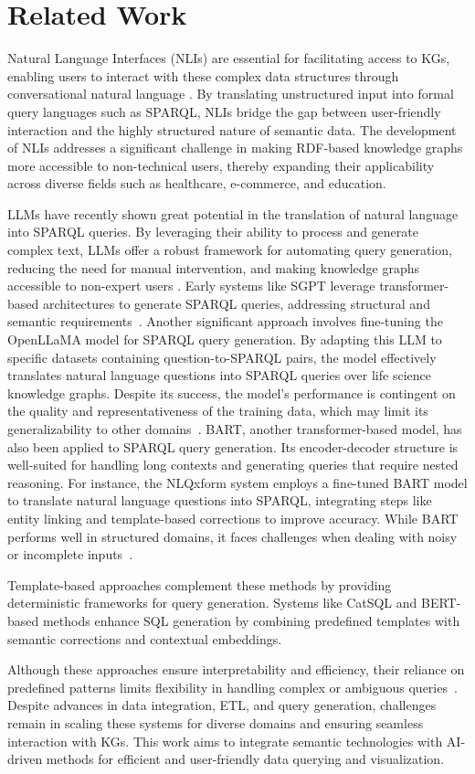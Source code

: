 \section{Related Work}
\label{sec:related}

Natural Language Interfaces (NLIs) are essential for facilitating access to KGs, enabling users to interact with these complex data structures through conversational natural language \cite{liang2021querying}. By translating unstructured input into formal query languages such as SPARQL, NLIs bridge the gap
between user-friendly interaction and the highly structured nature of semantic data. The development of NLIs addresses a significant challenge
in making RDF-based knowledge graphs more accessible to non-technical
users, thereby expanding their applicability across diverse fields such as healthcare, e-commerce, and education.

LLMs have recently shown great potential in the
translation of natural language into SPARQL queries. By leveraging their
ability to process and generate complex text, LLMs offer a robust framework for automating query generation, reducing the need for manual intervention, and making knowledge graphs accessible to non-expert users \cite{Pan_2024}.
Early systems like SGPT leverage transformer-based architectures to generate SPARQL queries, addressing structural and semantic requirements~\cite{Rony2022SGPT}.
Another significant approach involves fine-tuning the OpenLLaMA model for SPARQL query generation.
By adapting this LLM to specific datasets containing question-to-SPARQL pairs, the model effectively translates natural language questions into SPARQL
queries over life science knowledge graphs. Despite its success, the model's performance is contingent on the quality and representativeness of the training data,
which may limit its generalizability to other domains~\cite{Reyes2024SPARQLGA}. BART, another transformer-based model, has also been applied to SPARQL query generation.
Its encoder-decoder structure is well-suited for handling long contexts and generating queries that require nested reasoning.
For instance, the NLQxform system employs a fine-tuned BART model to translate natural language questions into SPARQL,
integrating steps like entity linking and template-based corrections to improve accuracy. While BART performs well in structured domains,
it faces challenges when dealing with noisy or incomplete inputs~\cite{wang2023nlqxformlanguagemodelbasedquestion}. 


Template-based approaches complement these methods by providing deterministic frameworks for query generation. Systems like CatSQL and BERT-based methods enhance
SQL generation by combining predefined templates with semantic corrections and contextual embeddings.

Although these approaches ensure interpretability and efficiency, their reliance on predefined patterns limits flexibility in handling complex or ambiguous queries~\cite{Fu2023CatSQL, Long2021Bert-based}. 
Despite advances in data integration, ETL, and query generation, challenges remain in scaling these systems for diverse domains and ensuring seamless
interaction with KGs. This work aims to integrate semantic technologies with AI-driven methods for efficient and user-friendly data querying and visualization.